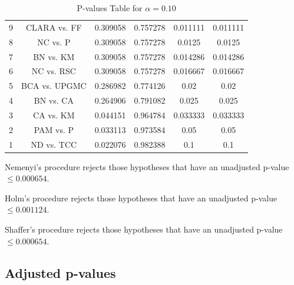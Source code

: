 \documentclass[a4paper,10pt]{article}
\begin{document}
\begin{landscape}
\begin{table}[!htp]
\begin{tabular}{cccccc}
9&CLARA vs. FF&0.309058&0.757278&0.011111&0.011111\\
8&NC vs. P&0.309058&0.757278&0.0125&0.0125\\
7&BN vs. KM&0.309058&0.757278&0.014286&0.014286\\
6&NC vs. RSC&0.309058&0.757278&0.016667&0.016667\\
5&BCA vs. UPGMC&0.286982&0.774126&0.02&0.02\\
4&BN vs. CA&0.264906&0.791082&0.025&0.025\\
3&CA vs. KM&0.044151&0.964784&0.033333&0.033333\\
2&PAM vs. P&0.033113&0.973584&0.05&0.05\\
1&ND vs. TCC&0.022076&0.982388&0.1&0.1\\
\hline
\end{tabular}
\caption{P-values Table for $\alpha=0.10$}
\end{table}Nemenyi's procedure rejects those hypotheses that have an unadjusted p-value $\le0.000654$.

Holm's procedure rejects those hypotheses that have an unadjusted p-value $\le0.001124$.

Shaffer's procedure rejects those hypotheses that have an unadjusted p-value $\le0.000654$.

\pagebreak

\subsection{Adjusted p-values}


\end{landscape}
\end{document}

